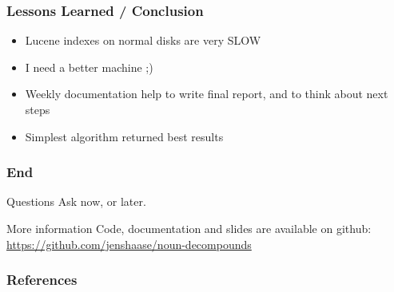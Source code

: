 \documentclass[accentcolor=tud9b, colorbacktitle, inverttitle]{tudbeamer}
\begin{document}
\begin{frame}
  \frametitle{Lessons Learned / Conclusion}

  \begin{itemize}
    \item Lucene indexes on normal disks are very SLOW
    \item I need a better machine ;)

    \vspace{10pt}
    \item Weekly documentation help to write final report, and to think about next steps

    \vspace{10pt}
    \item Simplest algorithm returned best results
  \end{itemize}
\end{frame}

\begin{frame}
  \frametitle{End}
  
\begin{block}{Questions}
  Ask now, or later.
\end{block}

\begin{block}{More information}
  Code, documentation and slides are available on github: \url{https://github.com/jenshaase/noun-decompounds}
\end{block}
\end{frame}

\begin{frame}
  \frametitle{References}
  
  
  

\end{frame}
\end{document}
